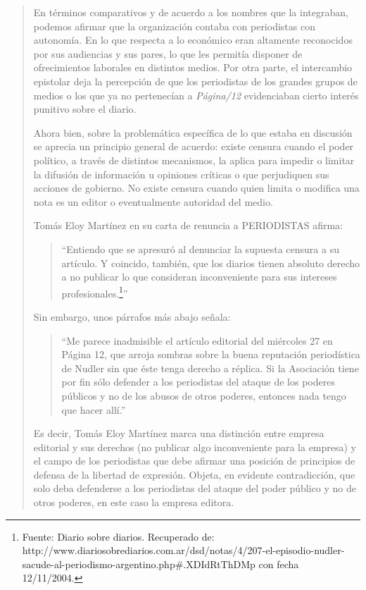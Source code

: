 \begin{quote}
En términos comparativos y de acuerdo a los nombres que la integraban, podemos afirmar que la organización contaba con periodistas con autonomía. En lo que respecta a lo económico eran altamente reconocidos por sus audiencias y sus pares, lo que les permitía disponer de ofrecimientos laborales en distintos medios. Por otra parte, el intercambio epistolar deja la percepción de que los periodistas de los grandes grupos de medios o los que ya no pertenecían a \emph{Página/12} evidenciaban cierto interés punitivo sobre el diario.

Ahora bien, sobre la problemática específica de lo que estaba en discusión se aprecia un principio general de acuerdo: existe censura cuando el poder político, a través de distintos mecanismos, la aplica para impedir o limitar la difusión de información u opiniones críticas o que perjudiquen sus acciones de gobierno. No existe censura cuando quien limita o modifica una nota es un editor o eventualmente autoridad del medio.

Tomás Eloy Martínez en su carta de renuncia a PERIODISTAS afirma:

\begin{quote}
	\enquote{Entiendo que se apresuró al denunciar la supuesta censura a su artículo. Y coincido, también, que los diarios tienen absoluto derecho a no publicar lo que consideran inconveniente para sus intereses profesionales.\footnote{ Fuente: Diario sobre diarios. Recuperado de: http://www.diariosobrediarios.com.ar/dsd/notas/4/207-el-episodio-nudler-sacude-al-periodismo-argentino.php#.XDIdRtThDMp con fecha 12/11/2004.}}
\end{quote}


Sin embargo, unos párrafos más abajo señala:

\begin{quote}
	\enquote{Me parece inadmisible el artículo editorial del miércoles 27 en Página 12, que arroja sombras sobre la buena reputación periodística de Nudler sin que éste tenga derecho a réplica. Si la Asociación tiene por fin sólo defender a los periodistas del ataque de los poderes públicos y no de los abusos de otros poderes, entonces nada tengo que hacer allí.}
\end{quote}


Es decir, Tomás Eloy Martínez marca una distinción entre empresa editorial y sus derechos (no publicar algo inconveniente para la empresa) y el campo de los periodistas que debe afirmar una posición de principios de defensa de la libertad de expresión. Objeta, en evidente contradicción, que solo deba defenderse a los periodistas del ataque del poder público y no de otros poderes, en este caso la empresa editora.


\end{quote}
